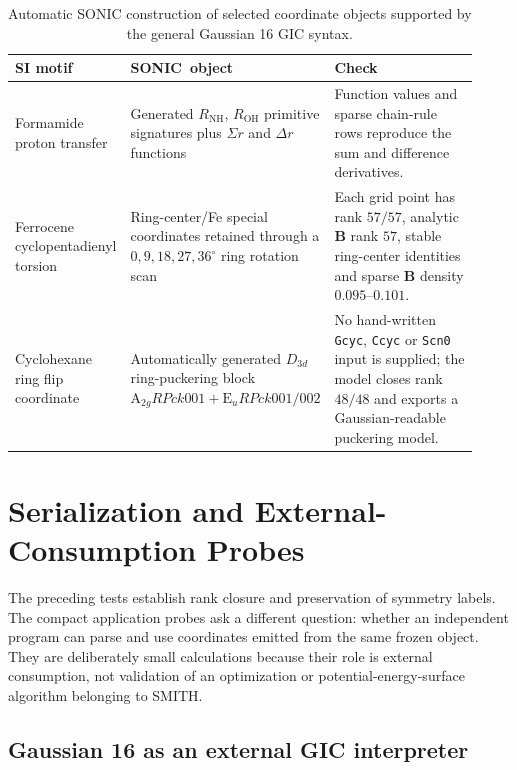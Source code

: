 \documentclass[journal=jctcce,manuscript=article,layout=traditional]{achemso}
\newcommand{\SONIC}{SONIC}
\newcommand{\Bmat}{\mathbf{B}}
\theoremstyle{definition}
\begin{document}
\begin{table}[htbp]
\centering
\scriptsize
\setlength{\tabcolsep}{3pt}
\caption{Automatic SONIC construction of selected coordinate objects supported
by the general Gaussian 16 GIC syntax.}
\label{tab:frisch-si}
\begin{tabular}{@{}p{0.20\linewidth}p{0.31\linewidth}p{0.41\linewidth}@{}}
\toprule
SI motif & \SONIC\ object & Check \\
\midrule
Formamide proton transfer & Generated \(R_{\mathrm{NH}}\), \(R_{\mathrm{OH}}\)
primitive signatures plus \(\Sigma r\) and \(\Delta r\) functions & Function
values and sparse chain-rule rows reproduce the sum and difference derivatives. \\
\midrule
Ferrocene cyclopentadienyl torsion & Ring-center/Fe special coordinates retained through a
\(0,9,18,27,36^\circ\) ring rotation scan & Each grid point has rank
\(57/57\), analytic \(\Bmat\) rank \(57\), stable ring-center identities and
sparse \(\Bmat\) density \(0.095\)--\(0.101\). \\
\midrule
Cyclohexane ring flip coordinate & Automatically generated \(D_{3d}\)
ring-puckering block \(\mathrm{A}_{2g}RPck001+\mathrm{E}_uRPck001/002\) &
No hand-written \texttt{Gcyc}, \texttt{Ccyc} or \texttt{Scn0} input is supplied;
the model closes rank \(48/48\) and exports a Gaussian-readable puckering
model. \\
\bottomrule
\end{tabular}
\end{table}

\section{Serialization and External-Consumption Probes}

The preceding tests establish rank closure and preservation of symmetry labels.
The compact application probes ask a different
question: whether an independent program can parse and use coordinates emitted
from the same frozen object.  They are deliberately small calculations because
their role is external consumption, not validation of an optimization or
potential-energy-surface algorithm belonging to SMITH.

\subsection{Gaussian 16 as an external GIC interpreter}
\end{document}
